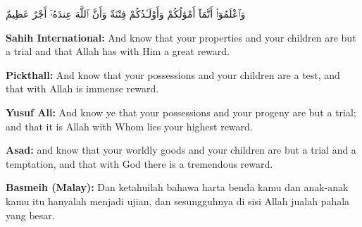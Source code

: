 \documentclass[11pt,a4paper,openany]{book}
\let\textAR\textarabic
\newcommand{\quranverse}[1]{{\centering\Large\textAR{#1}\par}}
\begin{document}
\begin{quranbox}[Qur'an 8:28]
\quranverse{وَٱعْلَمُوٓا۟ أَنَّمَآ أَمْوَٰلُكُمْ وَأَوْلَـٰدُكُمْ فِتْنَةٌ وَأَنَّ ٱللَّهَ عِندَهُۥٓ أَجْرٌ عَظِيمٌ}

\vspace{6pt}
\noindent\textbf{Sahih International:} And know that your properties and your children are but a trial and that Allah has with Him a great reward.

\vspace{4pt}
\noindent\textbf{Pickthall:} And know that your possessions and your children are a test, and that with Allah is immense reward.

\vspace{4pt}
\noindent\textbf{Yusuf Ali:} And know ye that your possessions and your progeny are but a trial; and that it is Allah with Whom lies your highest reward.

\vspace{4pt}
\noindent\textbf{Asad:} and know that your worldly goods and your children are but a trial and a temptation, and that with God there is a tremendous reward.

\vspace{4pt}
\noindent\textbf{Basmeih (Malay):} Dan ketahuilah bahawa harta benda kamu dan anak-anak kamu itu hanyalah menjadi ujian, dan sesungguhnya di sisi Allah jualah pahala yang besar.
\end{quranbox}
\end{document}

